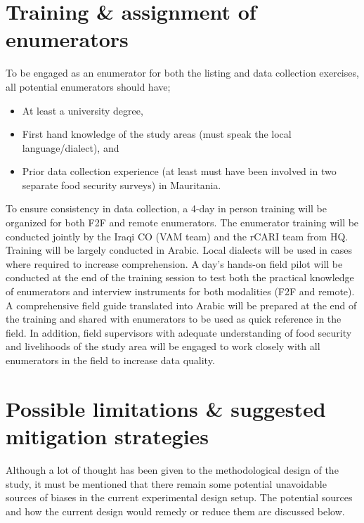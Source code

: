 \documentclass[11pt,harvard]{article}
\begin{document}
	\pagebreak

	\section{Training \& assignment of enumerators}
	
	To be engaged as an enumerator for both the listing and data collection exercises, all potential enumerators should have; 
	\begin{itemize}[left=2.0em]
		\item [1.] At least a university degree,
		\item [2.] First hand knowledge of the study areas (must speak the local language/dialect), and 
		\item [3.] Prior data collection experience (at least must have been involved in two separate food security surveys) in Mauritania. 
	\end{itemize}
	
	To ensure consistency in data collection, a 4-day in person training will be organized for both F2F and remote enumerators. The enumerator training will be conducted jointly by the Iraqi CO (VAM team) and the rCARI team from HQ. Training will be largely conducted in Arabic. Local dialects will be used in cases where required to increase comprehension.
	A day's hands-on field pilot will be conducted at the end of the training session to test both the practical knowledge of enumerators and interview instruments for both modalities (F2F and remote).
	A comprehensive field guide translated into Arabic will be prepared at the end of the training and shared with enumerators to be used as quick reference in the field. In addition, field supervisors with adequate understanding of food security and livelihoods of the study area will be engaged to work closely with all enumerators in the field to increase data quality.
	
	\section{Possible limitations \& suggested mitigation strategies}
	
	Although a lot of thought has been given to the methodological design of the study, it must be mentioned that there remain some potential unavoidable sources of biases in the current experimental design setup. The potential sources and how the current design would remedy or reduce them are discussed below. 
	
\end{document}
